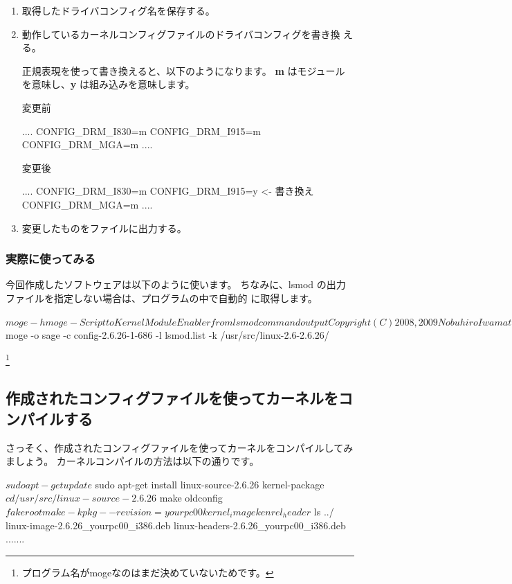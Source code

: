 \documentclass[mingoth,a4paper]{jsarticle}
\begin{document}
\begin{enumerate}
\item 取得したドライバコンフィグ名を保存する。
\item 動作しているカーネルコンフィグファイルのドライバコンフィグを書き換
      える。

正規表現を使って書き換えると、以下のようになります。
{\bf m} はモジュールを意味し、{\bf y} は組み込みを意味します。

変更前
\begin{commandline}
....
CONFIG_DRM_I830=m
CONFIG_DRM_I915=m
CONFIG_DRM_MGA=m
....
\end{commandline}

変更後
\begin{commandline}
....
CONFIG_DRM_I830=m
CONFIG_DRM_I915=y <- 書き換え
CONFIG_DRM_MGA=m
....
\end{commandline}

\item 変更したものをファイルに出力する。

\end{enumerate}

\subsubsection{実際に使ってみる}
今回作成したソフトウェアは以下のように使います。
ちなみに、lsmod の出力ファイルを指定しない場合は、プログラムの中で自動的
に取得します。
\begin{commandline}
$ moge -h
moge - Script to Kernel Module Enabler from lsmod command output

Copyright (C) 2008,2009 Nobuhiro Iwamatsu <iwamatsu@nigauri.org>
Usage: moge [options]
	-c, --configfile <file>   Kernel config file name
	-k, --kernel              Kernel source path
	-o, --output <file>       outout file
	-l, --lsmod               lsmod command output file
	-h, --help                display this help screen and exit
	-v, --version             show the version and exit

By Nobuhiro Iwamatsu <iwmatsu@nigauri.org>
$ moge -o sage -c config-2.6.26-1-686 -l lsmod.list -k /usr/src/linux-2.6-2.6.26/
\end{commandline}
\footnote{プログラム名がmogeなのはまだ決めていないためです。}

\subsection{作成されたコンフィグファイルを使ってカーネルをコンパイルする}

さっそく、作成されたコンフィグファイルを使ってカーネルをコンパイルしてみ
ましょう。
カーネルコンパイルの方法は以下の通りです。
\begin{commandline}
$ sudo apt-get update
$ sudo apt-get install linux-source-2.6.26 kernel-package
$ cd /usr/src/linux-source-2.6.26
$ make oldconfig
$ fakeroot make-kpkg --revision=yourpc00 kernel_image kenrel_header
$ ls ../
linux-image-2.6.26_yourpc00_i386.deb
linux-headers-2.6.26_yourpc00_i386.deb
.......
\end{commandline}
\end{document}
